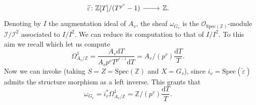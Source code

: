\begin{ex}[]
\begin{enumerate}
		\begin{equation*}
		\begin{tikzcd}[row sep = 0ex
			,/tikz/column 1/.append style={anchor=base east}
			,/tikz/column 2/.append style={anchor=base west}]
			\widetilde{\varepsilon}\colon 
			\mathbb{Z}[T]/ (T^{p^v} - 1)\arrow[r, "", rightarrow] &
			\mathbb{Z}
		.\end{tikzcd}
		\end{equation*} 
		Denoting by $I$ the augmentation ideal of $A_v$,
		the sheaf $\omega_{G_v}$ is the $\mathcal{O}_{ \mathrm{Spec}(\mathbb{Z}) }$-module
		$\mathcal{I}/\mathcal{I}^2$ associated to $I/I^2$.
		We can reduce its computation to that of $I/I^2$.
		To this aim we recall \cite[\S6.1, proposition 1.8(d) and example 1.10]{Liu}
		which let us compute
		\begin{equation*}
			\Omega^1_{A_v/\mathbb{Z}} = \frac{ A_v \mathrm{d}T }{ A_v p^v T^{p^{v-1}} \mathrm{d}T }
			= A_v / (p^v) \frac{ \mathrm{d}T }{ T }
		.\end{equation*}
		Now we can invoke 
		\cite[\href{https://stacks.math.columbia.edu/tag/0474}{Lemma 0474}]{SP}
		(taking $S = Z = \mathrm{Spec}(\mathbb{Z})$ and $X = G_v$),
		since $i_v = \mathrm{Spec}(\widetilde{\varepsilon})$ admits the structure morphism
		as a left inverse.
		This grants that
		\begin{equation*}
		\omega_{G_v} = i_v^* \Omega^1_{A_v/\mathbb{Z}} =
		\mathbb{Z}/ (p^v) \frac{ \mathrm{d}T }{ T }
		.\end{equation*}
		

\end{enumerate}
\end{ex}
